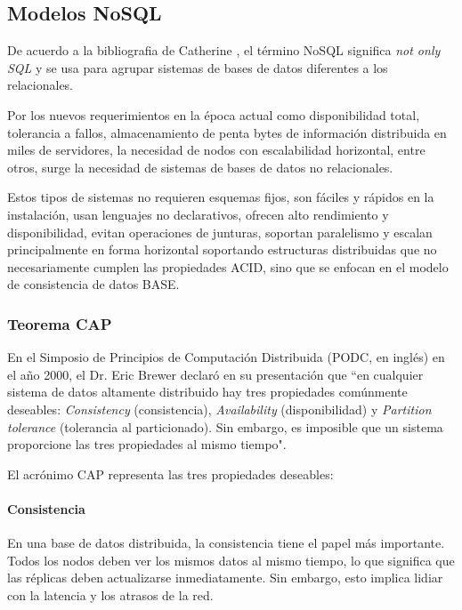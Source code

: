 \subsection{Modelos NoSQL}
De acuerdo a la bibliografia de Catherine \cite{cristina_marta_bender_topicos_nodate}, el término NoSQL significa \textit{not only SQL} y se usa para agrupar sistemas de bases de datos diferentes a los relacionales.


Por los nuevos requerimientos en la época actual como disponibilidad total, tolerancia a fallos, almacenamiento de penta bytes de información distribuida en miles de servidores, la necesidad de nodos con escalabilidad horizontal, entre otros, surge la necesidad de sistemas de bases de datos no relacionales.


Estos tipos de sistemas no requieren esquemas fijos, son fáciles y rápidos en la instalación, usan lenguajes no declarativos, ofrecen alto rendimiento y disponibilidad, evitan operaciones de junturas, soportan paralelismo y escalan principalmente en forma horizontal soportando estructuras distribuidas que no necesariamente cumplen las propiedades ACID\cite{cristina_marta_bender_topicos_nodate}, sino que se enfocan en el modelo de consistencia de datos BASE.

\subsubsection{Teorema CAP}
En el  Simposio de Principios de Computación Distribuida (PODC, en inglés) en el año 2000\cite{brewer_towards_2000}, el Dr. Eric Brewer declaró en su presentación que ``en cualquier sistema de datos altamente distribuido hay tres propiedades comúnmente deseables: \textit{Consistency} (consistencia), \textit{Availability} (disponibilidad) y \textit{Partition tolerance} (tolerancia al particionado). Sin embargo, es imposible que un sistema proporcione las tres propiedades al mismo tiempo".


El acrónimo CAP representa las tres propiedades deseables:

\paragraph*{Consistencia}

En una base de datos distribuida, la consistencia tiene el papel más importante. Todos los nodos deben ver los mismos datos al mismo tiempo, lo que significa que las réplicas deben actualizarse inmediatamente. Sin embargo, esto implica lidiar con la latencia y los atrasos de la red.


